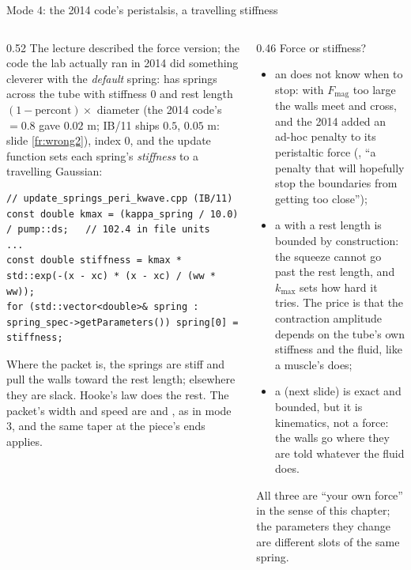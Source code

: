 \documentclass[aspectratio=169,11pt]{beamer}
\begin{document}
\begin{frame}[fragile]{Mode 4: the 2014 code's peristalsis, a travelling stiffness}
\label{fr:kwave}
\begin{columns}[T,onlytextwidth]
\begin{column}{0.52\textwidth}
\scriptsize The lecture described the force version; the code the lab actually ran in 2014 did something cleverer with the \emph{default} spring:  has springs across the tube with stiffness $0$ and rest length $(1 - \mathrm{percont})\times$ diameter (the 2014 code's  $= 0.8$ gave $0.02$ m; IB/11 ships $0.5$, $0.05$ m: slide \ref{fr:wrong2}), index 0, and the update function sets each spring's \emph{stiffness} to a travelling Gaussian:
\begin{lstlisting}[style=cpptiny]
// update_springs_peri_kwave.cpp (IB/11)
const double kmax = (kappa_spring / 10.0) / pump::ds;   // 102.4 in file units
...
const double stiffness = kmax * std::exp(-(x - xc) * (x - xc) / (ww * ww));
for (std::vector<double>& spring : spring_spec->getParameters()) spring[0] = stiffness;
\end{lstlisting}
\scriptsize Where the packet is, the springs are stiff and pull the walls toward the rest length; elsewhere they are slack. Hooke's law does the rest. The packet's width and speed are  and , as in mode 3, and the same taper at the piece's ends applies.
\end{column}
\begin{column}{0.46\textwidth}
\scriptsize Force or stiffness?
\begin{itemize}
  \item an  does not know when to stop: with $F_{\mathrm{mag}}$ too large the walls meet and cross, and the 2014  added an ad-hoc penalty to its peristaltic force (, ``a penalty that will hopefully stop the boundaries from getting too close'');
  \item a  with a rest length is bounded by construction: the squeeze cannot go past the rest length, and $k_{\max}$ sets how hard it tries. The price is that the contraction amplitude depends on the tube's own stiffness and the fluid, like a muscle's does;
  \item a  (next slide) is exact and bounded, but it is kinematics, not a force: the walls go where they are told whatever the fluid does.
\end{itemize}
\scriptsize All three are ``your own force'' in the sense of this chapter; the parameters they change are different slots of the same spring.
\end{column}
\end{columns}
\end{frame}
\end{document}
